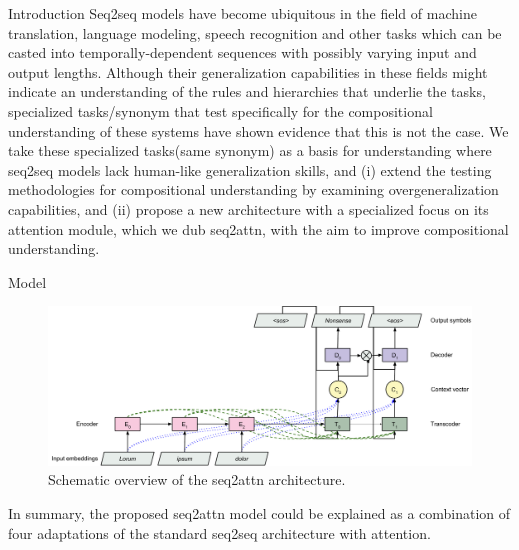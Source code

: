 \documentclass[final,hyperref={pdfpagelabels=false}]{beamer}
\begin{document}
\begin{frame}[t]
\begin{columns}[t]
\begin{column}{.465\textwidth}
\begin{block}{Introduction}
Seq2seq models have become ubiquitous in the field of machine translation, language modeling, speech recognition and other tasks which can be casted into temporally-dependent sequences with possibly varying input and output lengths.
Although their generalization capabilities in these fields might indicate an understanding of the rules and hierarchies that underlie the tasks, specialized tasks/synonym that test specifically for the \alert{compositional understanding} of these systems have shown evidence that this is not the case.
We take these specialized tasks(same synonym) as a basis for understanding where seq2seq models lack human-like generalization skills, and (i) extend the testing methodologies for compositional understanding by examining \alert{overgeneralization} capabilities, and (ii) propose a new architecture with a specialized focus on its attention module, which we dub \alert{seq2attn}, with the aim to improve compositional understanding.
\end{block}


\begin{block}{Model}

\begin{figure}
\includegraphics[width=0.9\linewidth]{model}
\caption{Schematic overview of the seq2attn architecture.}
\end{figure}
In summary, the proposed seq2attn model could be explained as a combination of four adaptations of the standard seq2seq architecture with attention. 


\end{block}
\end{column}
\end{columns}
\end{frame}
\end{document}
